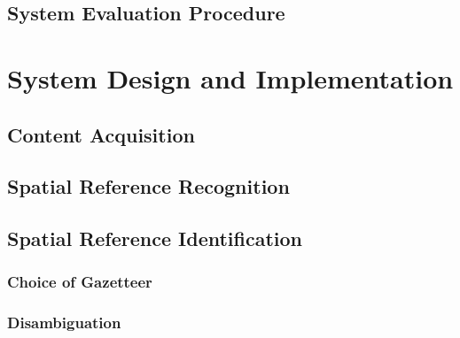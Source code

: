 \documentclass[12pt, a4paper]{report}
\begin{document}
\section{System Evaluation Procedure}


\chapter{System Design and Implementation}

\section{Content Acquisition}

\section{Spatial Reference Recognition}




\section{Spatial Reference Identification}

\subsection{Choice of Gazetteer}



\subsection{Disambiguation}
\end{document}
